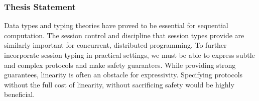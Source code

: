\label{thesis}
\begin{frame}\frametitle{Thesis Statement}
    Data types and typing theories have proved to be essential for sequential computation. The session control and discipline that session types provide are  similarly important for concurrent, distributed programming. To further incorporate session typing in practical settings, we must be able to express subtle and complex protocols and make safety guarantees. While providing strong guarantees, linearity is often an obstacle for expressivity. Specifying protocols without the full cost of linearity, without sacrificing safety would be highly beneficial.
\end{frame}
